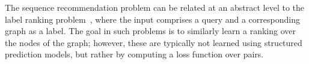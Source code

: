 
The sequence recommendation problem can be related at an abstract level to the label ranking problem~\citep{Dekel:2003},
where the input comprises a query and a corresponding graph as a label.
The goal in such problems is to similarly learn a ranking over the nodes of the graph;
however, these are typically not learned using structured prediction models,
but rather by computing a loss function over pairs.

